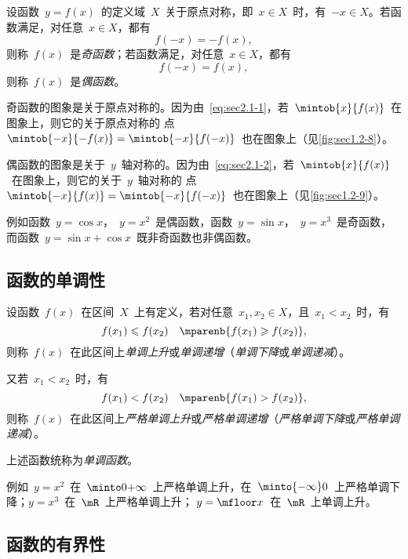 设函数~$y=f(x)$~的定义域~$X$~关于原点对称，即~$x\in X$~时，有~$-x\in X$。若函数满足，对任意~$x\in X$，都有
\begin{equation}\label{eq:sec2.1-1}
f(-x)=-f(x),
\end{equation}
则称~$f(x)$~是\emph{奇函数}；若函数满足，对任意~$x\in X$，都有
\begin{equation}\label{eq:sec2.1-2}
f(-x)=f(x),
\end{equation}
则称~$f(x)$~是\emph{偶函数}。

奇函数的图象是关于原点对称的。因为由~\ref{eq:sec2.1-1}，若~$\mintob{x}{f(x)}$~在图象上，则它的关于原点对称的
点~$\mintob{-x}{-f(x)}=\mintob{-x}{f(-x)}$~也在图象上（见\ref{fig:sec1.2-8}）。

偶函数的图象是关于~$y$~轴对称的。因为由~\ref{eq:sec2.1-2}，若~$\mintob{x}{f(x)}$~在图象上，则它的关于~$y$~轴对称的
点~$\mintob{-x}{f(x)}=\mintob{-x}{f(-x)}$~也在图象上（见\ref{fig:sec1.2-9}）。

\begin{figure}
\begin{floatrow}
\end{floatrow}
\end{figure}

例如函数~$y=\cos x$，~$y=x^2$~是偶函数，函数~$y=\sin x$，~$y=x^3$~是奇函数，而函数~$y=\sin x+\cos x$~既非奇函数也非偶函数。

\subsection{函数的单调性}

设函数~$f(x)$~在区间~$X$~上有定义，若对任意~$x_1,x_2\in X$，且~$x_1<x_2$~时，有
\[
  f(x_1)\leq f(x_2)\quad\mparenb{f(x_1)\geq f(x_2)},
\]
则称~$f(x)$~在此区间上\emph{单调上升}或\emph{单调递增}（\emph{单调下降}或\emph{单调递减}）。

又若~$x_1<x_2$~时，有
\[
  f(x_1)<f(x_2)\quad\mparenb{f(x_1)>f(x_2)},
\]
则称~$f(x)$~在此区间上\emph{严格单调上升}或\emph{严格单调递增}（\emph{严格单调下降}或\emph{严格单调递减}）。

上述函数统称为\emph{单调函数}。

例如~$y=x^2$~在~$\minto 0{+\infty}$~上严格单调上升，在~$\minto{-\infty}0$~上严格单调下降；$y=x^3$~在~$\mR$~上严格单调上升；%
$y=\mfloor x$~在~$\mR$~上单调上升。

\subsection{函数的有界性}

